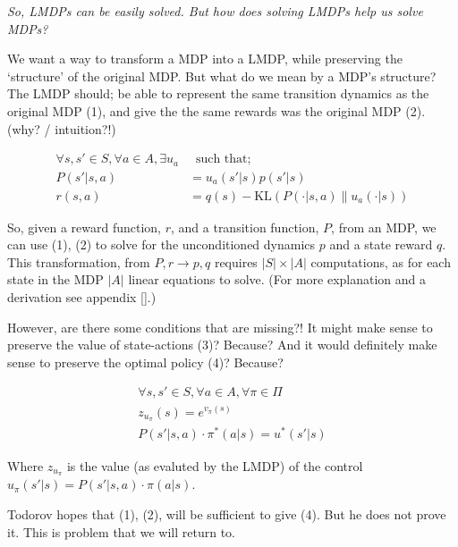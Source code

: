 \begin{displayquote}
\textit{So, LMDPs can be easily solved. But how does solving LMDPs help us solve MDPs?}
\end{displayquote}

We want a way to transform a MDP into a LMDP, while preserving the
`structure' of the original MDP. But what do we mean by a MDP's structure?
The LMDP should; be able to represent the same transition dynamics as the original MDP (1),
and give the the same rewards was the original MDP (2). \cite{Todorov} {\color{red}(why? / intuition?!)}

\begin{align*}
\forall s, s' \in S, \forall a \in A, \exists u_a& \;\;\text{such that;} \\
P(s' | s, a) &= u_a(s'|s)p(s'|s) \tag{1} \\
r(s, a) &= q(s) - \text{KL}(P(\cdot | s, a) \parallel u_a(\cdot| s) ) \tag{2}
\end{align*}


So, given a reward function, $r$, and a transition function, $P$,
from an MDP, we can use (1), (2) to solve for the unconditioned dynamics $p$ and a state reward $q$.
This transformation, from $P, r \to p, q$ requires $|S| \times |A|$ computations, as for each state in the
MDP \(|A|\) linear equations to solve. (For more explanation and a derivation see appendix [].)

However, are there some conditions that are missing?!
It might make sense to preserve the value of state-actions (3)? {\color{red}Because?}
And it would definitely make sense to preserve the optimal policy (4)? {\color{red}Because?}

\begin{align*}
\forall s, s' \in S, \forall a \in A, \forall \pi \in \Pi \\
z_{u_{\pi}}(s) = e^{v_{\pi}(s)} \tag{3} \\
P(s'|s, a) \cdot \pi^{* }(a|s) = u^{* }(s'|s) \tag{4}
\end{align*}

Where $z_{u_{\pi}}$ is the value (as evaluted by the LMDP) of the control $u_{\pi}(s'|s) = P(s'|s, a) \cdot \pi(a|s)$.

Todorov hopes that (1), (2), will be sufficient to give (4). But he does not prove it.
This is problem that we will return to.

